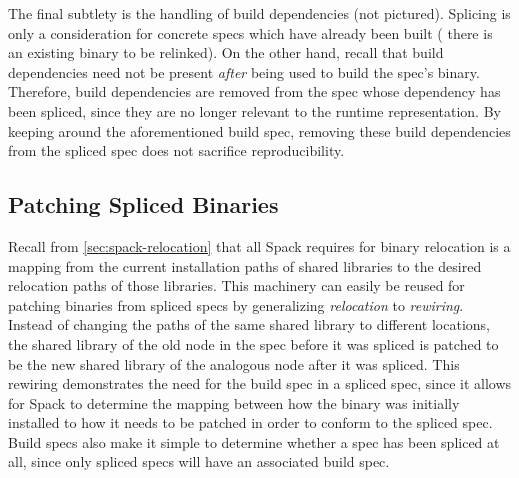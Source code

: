 The final subtlety is the handling of build dependencies (not
pictured). Splicing is only a consideration for concrete specs which have
already been built (\ie{} there is an existing binary to be
relinked). On the other hand, recall that build dependencies need not be present
\emph{after} being used to build the spec's binary.
Therefore, build dependencies are removed from the spec whose dependency
has been spliced, since they are no longer relevant to the runtime
representation. By keeping around the aforementioned build spec, removing these
build dependencies from the spliced spec does not sacrifice reproducibility.

\subsection{Patching Spliced Binaries}
\label{sec:splice-relocation}
Recall from \cref{sec:spack-relocation} that all Spack requires for binary
relocation is a mapping from the current installation paths of shared libraries
to the desired relocation paths of those libraries. This machinery can easily be
reused for patching binaries from spliced specs by generalizing
\emph{relocation} to \emph{rewiring}. Instead of changing the paths of the same
shared library to different locations, the shared library of the old node in the
spec before it was spliced is patched to be the new shared library of the
analogous node after it was spliced. This rewiring demonstrates the need for the
build spec in a spliced spec, since it allows for Spack to determine the mapping
between how the binary was initially installed to how it needs to be patched in
order to conform to the spliced spec. Build specs also make it simple to
determine whether a spec has been spliced at all, since only spliced specs will
have an associated build spec.
